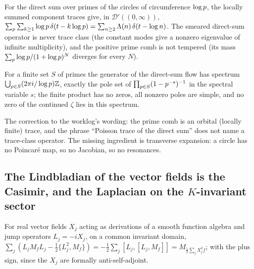 \begin{proposition}
\label{prop:prime-circles-orbital}
For the direct sum over primes of the circles of circumference $\log p$,
the locally summed component traces give, in $\mathcal D'((0,\infty))$,
$\sum_{p}\sum_{k\ge1}\log p\,\delta(t-k\log p) = \sum_{n\ge2}\Lambda(n)\,\delta(t-\log n)$.
The smeared direct-sum operator is never trace class (the constant modes
give a nonzero eigenvalue of infinite multiplicity), and the positive prime
comb is not tempered (its mass $\sum_{p}\log p/(1+\log p)^N$ diverges for
every $N$).
\end{proposition}

\begin{proposition}
\label{prop:finite-euler-spectrum}
For a finite set $S$ of primes the generator of the direct-sum flow has
spectrum $\bigcup_{p\in S}(2\pi i/\log p)\mathbb Z$, exactly the pole set
of $\prod_{p\in S}(1-p^{-s})^{-1}$ in the spectral variable $s$; the
finite product has no zeros, all nonzero poles are simple, and no zero of the
continued $\zeta$ lies in this spectrum.
\end{proposition}

The correction to the worklog's wording: the prime comb is an orbital
(locally finite) trace, and the phrase ``Poisson trace of the direct sum''
does not name a trace-class operator. The missing ingredient is transverse
expansion: a circle has no Poincar\'e map, so no Jacobian, so no resonances.

\subsection{The Lindbladian of the vector fields is the Casimir, and the Laplacian on the $K$-invariant sector}

\begin{proposition}
\label{prop:lindblad-sum-of-squares}
For real vector fields $X_j$ acting as derivations of a smooth function
algebra and jump operators $L_j = -iX_j$, on a common invariant domain,
$\sum_j(L_jM_fL_j - \tfrac12\{L_j^2,M_f\}) = -\tfrac12\sum_j[L_j,[L_j,M_f]] =
M_{\frac12\sum_jX_j^2f}$; with the plus sign, since the $X_j$ are formally
anti-self-adjoint.
\end{proposition}

